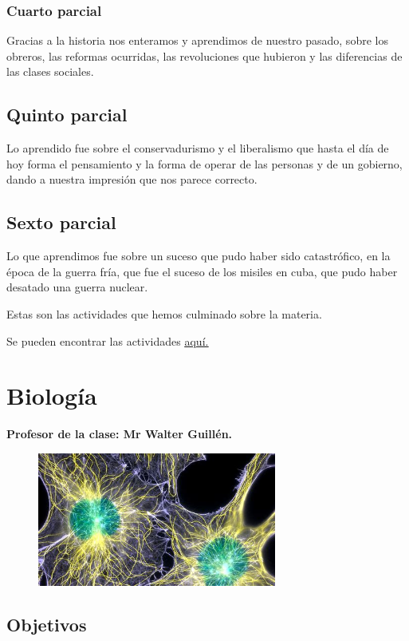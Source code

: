 \documentclass[a4paper, 12pt]{article}
\begin{document}
\subsubsection{Cuarto parcial}
Gracias a la historia nos enteramos y aprendimos de nuestro pasado, sobre los obreros, las reformas ocurridas, las revoluciones que hubieron y las diferencias de las clases sociales.

\subsection{Quinto parcial}
Lo aprendido fue sobre el conservadurismo y el liberalismo que hasta el día de hoy forma el pensamiento y la forma de operar de las personas y de un gobierno, dando a nuestra impresión que nos parece correcto.

\subsection{Sexto parcial}
Lo que aprendimos fue sobre un suceso que pudo haber sido catastrófico, en la época de la guerra fría, que fue el suceso de los misiles en cuba, que pudo haber desatado una guerra nuclear.

Estas son las actividades que hemos culminado sobre la materia.

Se pueden encontrar las actividades \href{https://drive.google.com/drive/folders/1J-HMvcP6JzfQoPtuu-0Y0o9HO8xSQonl?usp=sharing}{\underline{aquí.}}

\section{Biología}
\textbf{Profesor de la clase: Mr Walter Guillén.}

\begin{figure}[h]
  \includegraphics[width=0.7\textwidth, center]{biologia.jpeg}
\end{figure}

\subsection{Objetivos}
\end{document}
